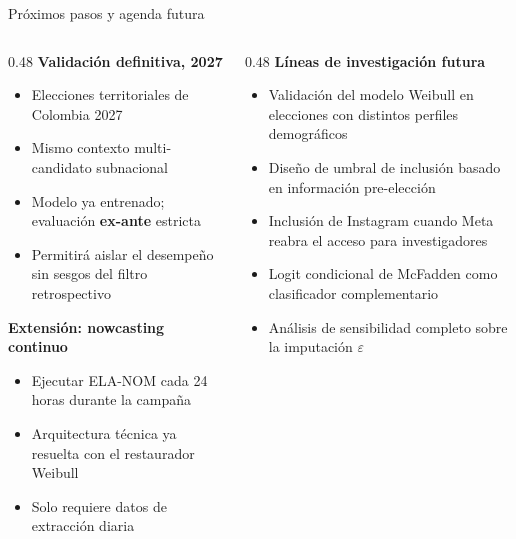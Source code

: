 \setcounter{framenumber}{34}
\makered
\begin{frame}{Próximos pasos y agenda futura}
  \begin{columns}[T]
    \begin{column}{0.48\textwidth}
      \textbf{Validación definitiva, 2027}
      \begin{itemize}
        \item Elecciones territoriales de Colombia 2027
        \item Mismo contexto multi-candidato subnacional
        \item Modelo ya entrenado; evaluación \textbf{ex-ante} estricta
        \item Permitirá aislar el desempeño sin sesgos del filtro retrospectivo
      \end{itemize}
      \vspace{0.4em}
      \textbf{Extensión: nowcasting continuo}
      \begin{itemize}
        \item Ejecutar ELA-NOM cada 24 horas durante la campaña
        \item Arquitectura técnica ya resuelta con el restaurador Weibull
        \item Solo requiere datos de extracción diaria
      \end{itemize}
    \end{column}
    \begin{column}{0.48\textwidth}
      \textbf{Líneas de investigación futura}
      \begin{itemize}
        \item Validación del modelo Weibull en elecciones con distintos perfiles demográficos
        \item Diseño de umbral de inclusión basado en información pre-elección
        \item Inclusión de Instagram cuando Meta reabra el acceso para investigadores
        \item Logit condicional de McFadden como clasificador complementario \corr{[Corr.\ 1.20]}
        \item Análisis de sensibilidad completo sobre la imputación $\varepsilon$ \corr{[Corr.\ 1.13]}
      \end{itemize}
    \end{column}
  \end{columns}
\end{frame}
\makeblue

